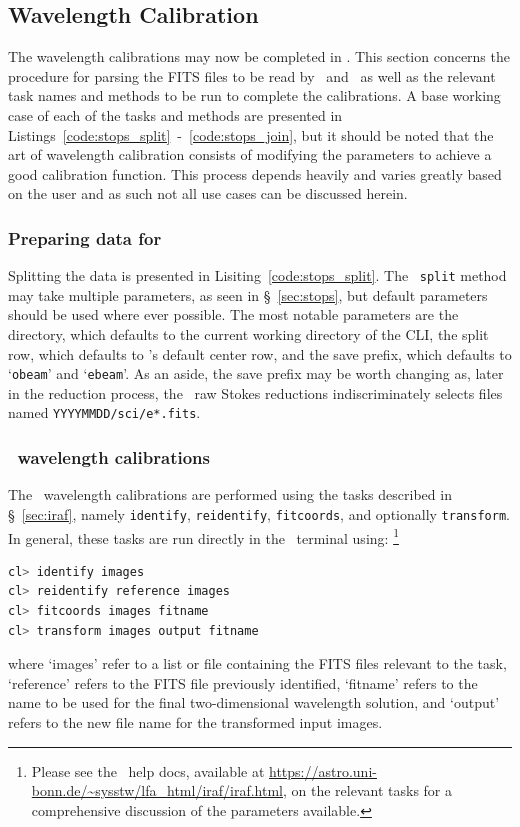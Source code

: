 \subsection{Wavelength Calibration} \label{subsec:reduc_wav}

The wavelength calibrations may now be completed in \iraf. This section concerns the procedure for parsing the \gls{FITS} files to be read by \iraf\ and \polsalt\ as well as the relevant task names and methods to be run to complete the calibrations. A base working case of each of the tasks and methods are presented in Listings~\ref{code:stops_split}~-~\ref{code:stops_join}, but it should be noted that the art of wavelength calibration consists of modifying the parameters to achieve a good calibration function. This process depends heavily and varies greatly based on the user and as such not all use cases can be discussed herein.

\subsubsection{Preparing data for \iraf}

Splitting the data is presented in Lisiting~\ref{code:stops_split}. The \stops\ \texttt{split} method may take multiple parameters, as seen in \S~\ref{sec:stops}, but default parameters should be used where ever possible. The most notable parameters are the directory, which defaults to the current working directory of the \gls{CLI}, the split row, which defaults to \polsalt's default center row, and the save prefix, which defaults to `\texttt{obeam}' and `\texttt{ebeam}'. As an aside, the save prefix may be worth changing as, later in the reduction process, the \polsalt\ raw Stokes reductions indiscriminately selects files named \texttt{YYYYMMDD/sci/e*.fits}.

\subsubsection{\iraf\ wavelength calibrations}

The \iraf\ wavelength calibrations are performed using the tasks described in \S~\ref{sec:iraf}, namely \texttt{identify}, \texttt{reidentify}, \texttt{fitcoords}, and optionally \texttt{transform}. In general, these tasks are run directly in the \iraf\ terminal using:%
\footnote{Please see the \iraf\ help docs, available at \url{https://astro.uni-bonn.de/~sysstw/lfa_html/iraf/iraf.html}, on the relevant tasks for a comprehensive discussion of the parameters available.}
\begin{lstlisting}[language=bash]
cl> identify images
cl> reidentify reference images
cl> fitcoords images fitname
cl> transform images output fitname
\end{lstlisting}
{\parskip=0pt where} `images' refer to a list or file containing the \gls{FITS} files relevant to the task, `reference' refers to the \gls{FITS} file previously identified, `fitname' refers to the name to be used for the final two-dimensional wavelength solution, and `output' refers to the new file name for the transformed input images.

